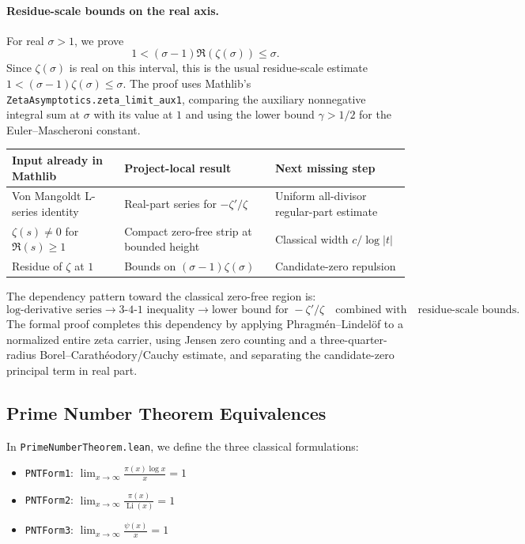 \documentclass[11pt,a4paper]{article}
\theoremstyle{remark}
\begin{document}
\paragraph{Residue-scale bounds on the real axis.}
For real $\sigma>1$, we prove
\[
1 < (\sigma-1)\Re(\zeta(\sigma)) \le \sigma.
\]
Since $\zeta(\sigma)$ is real on this interval, this is the usual
residue-scale estimate \(1<(\sigma-1)\zeta(\sigma)\le\sigma\).  The proof
uses Mathlib's \texttt{ZetaAsymptotics.zeta\_limit\_aux1}, comparing the
auxiliary nonnegative integral sum at $\sigma$ with its value at $1$ and using
the lower bound $\gamma>1/2$ for the Euler--Mascheroni constant.

\begin{center}
\begin{tabular}{lll}
\toprule
\textbf{Input already in Mathlib} & \textbf{Project-local result} & \textbf{Next missing step} \\
\midrule
Von Mangoldt L-series identity &
Real-part series for $-\zeta'/\zeta$ &
Uniform all-divisor regular-part estimate \\
$\zeta(s)\ne0$ for $\Re(s)\ge1$ &
Compact zero-free strip at bounded height &
Classical width $c/\log|t|$ \\
Residue of $\zeta$ at $1$ &
Bounds on $(\sigma-1)\zeta(\sigma)$ &
Candidate-zero repulsion \\
\bottomrule
\end{tabular}
\end{center}

The dependency pattern toward the classical zero-free region is:
\[
\text{log-derivative series}
\longrightarrow
\text{3-4-1 inequality}
\longrightarrow
\text{lower bound for }-\zeta'/\zeta
\quad\text{combined with}\quad
\text{residue-scale bounds}.
\]
The formal proof completes this dependency by applying Phragm\'en--Lindel\"of
to a normalized entire zeta carrier, using Jensen zero counting and a
three-quarter-radius Borel--Carath\'eodory/Cauchy estimate, and separating the
candidate-zero principal term in real part.

\subsection{Prime Number Theorem Equivalences}

In \texttt{PrimeNumberTheorem.lean}, we define the three classical
formulations:

\begin{itemize}[noitemsep]
  \item \texttt{PNTForm1}: $\displaystyle\lim_{x\to\infty}
    \frac{\pi(x)\log x}{x}=1$
  \item \texttt{PNTForm2}: $\displaystyle\lim_{x\to\infty}
    \frac{\pi(x)}{\operatorname{Li}(x)}=1$
  \item \texttt{PNTForm3}: $\displaystyle\lim_{x\to\infty}
    \frac{\psi(x)}{x}=1$
\end{itemize}
\end{document}
